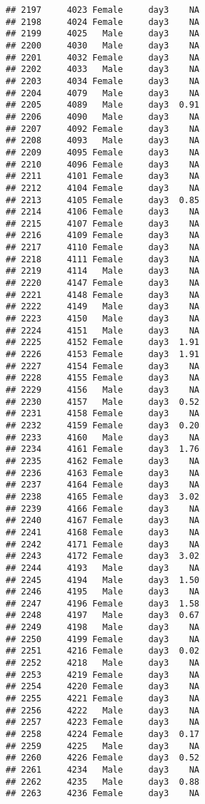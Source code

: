 \documentclass[
]{article}
\begin{document}
\begin{verbatim}
## 2197     4023 Female     day3    NA
## 2198     4024 Female     day3    NA
## 2199     4025   Male     day3    NA
## 2200     4030   Male     day3    NA
## 2201     4032 Female     day3    NA
## 2202     4033   Male     day3    NA
## 2203     4034 Female     day3    NA
## 2204     4079   Male     day3    NA
## 2205     4089   Male     day3  0.91
## 2206     4090   Male     day3    NA
## 2207     4092 Female     day3    NA
## 2208     4093   Male     day3    NA
## 2209     4095 Female     day3    NA
## 2210     4096 Female     day3    NA
## 2211     4101 Female     day3    NA
## 2212     4104 Female     day3    NA
## 2213     4105 Female     day3  0.85
## 2214     4106 Female     day3    NA
## 2215     4107 Female     day3    NA
## 2216     4109 Female     day3    NA
## 2217     4110 Female     day3    NA
## 2218     4111 Female     day3    NA
## 2219     4114   Male     day3    NA
## 2220     4147 Female     day3    NA
## 2221     4148 Female     day3    NA
## 2222     4149   Male     day3    NA
## 2223     4150   Male     day3    NA
## 2224     4151   Male     day3    NA
## 2225     4152 Female     day3  1.91
## 2226     4153 Female     day3  1.91
## 2227     4154 Female     day3    NA
## 2228     4155 Female     day3    NA
## 2229     4156   Male     day3    NA
## 2230     4157   Male     day3  0.52
## 2231     4158 Female     day3    NA
## 2232     4159 Female     day3  0.20
## 2233     4160   Male     day3    NA
## 2234     4161 Female     day3  1.76
## 2235     4162 Female     day3    NA
## 2236     4163 Female     day3    NA
## 2237     4164 Female     day3    NA
## 2238     4165 Female     day3  3.02
## 2239     4166 Female     day3    NA
## 2240     4167 Female     day3    NA
## 2241     4168 Female     day3    NA
## 2242     4171 Female     day3    NA
## 2243     4172 Female     day3  3.02
## 2244     4193   Male     day3    NA
## 2245     4194   Male     day3  1.50
## 2246     4195   Male     day3    NA
## 2247     4196 Female     day3  1.58
## 2248     4197   Male     day3  0.67
## 2249     4198   Male     day3    NA
## 2250     4199 Female     day3    NA
## 2251     4216 Female     day3  0.02
## 2252     4218   Male     day3    NA
## 2253     4219 Female     day3    NA
## 2254     4220 Female     day3    NA
## 2255     4221 Female     day3    NA
## 2256     4222   Male     day3    NA
## 2257     4223 Female     day3    NA
## 2258     4224 Female     day3  0.17
## 2259     4225   Male     day3    NA
## 2260     4226 Female     day3  0.52
## 2261     4234   Male     day3    NA
## 2262     4235   Male     day3  0.88
## 2263     4236 Female     day3    NA

\end{verbatim}
\end{document}
